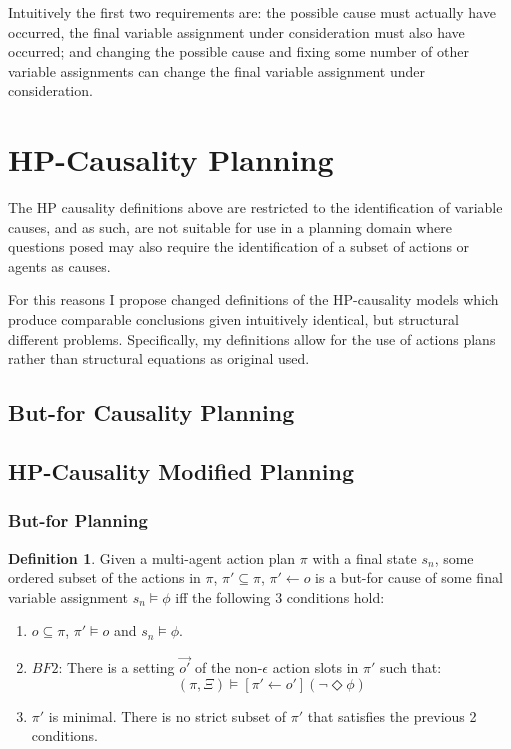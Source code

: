 \documentclass{article}
\theoremstyle{plain}
\theoremstyle{definition}
\newtheorem{defn}[thm]{Definition} %
\begin{document}
Intuitively the first two requirements are: the possible cause must actually have occurred, the final variable assignment under consideration must also have occurred; and changing the possible cause and fixing some number of other variable assignments can change the final variable assignment under consideration.




\newpage

\section{HP-Causality Planning}
The HP causality definitions above are restricted to the identification of variable causes, and as such, are not suitable for use in a planning domain where questions posed may also require the identification of a subset of actions or agents as causes.

For this reasons I propose changed definitions of the HP-causality models which produce comparable conclusions given intuitively identical, but structural different problems. Specifically, my definitions allow for the use of actions plans rather than structural equations as original used.

\subsection{But-for Causality Planning}

\subsection{HP-Causality Modified Planning}

\subsubsection*{But-for Planning}
\begin{defn} 

Given a multi-agent action plan $\pi$ with a final state $s_n$, some ordered subset of the actions in $\pi$, $\pi' \subseteq \pi$, $\pi' \leftarrow o$ is a but-for cause of some final variable assignment $s_n \models \phi$ iff the following 3 conditions hold:
\begin{enumerate}
\item  $o \subseteq \pi$, $\pi' \models o$ and $s_n \models \phi$.
\item $BF2$: There is a setting $\vec{o'}$ of the non-$\epsilon$ action slots in $\pi'$ such that:
\[
(\pi, \Xi) \models [\pi' \leftarrow o'](\lnot \Diamond \phi)
\]
\item $\pi'$ is minimal. There is no strict subset of $\pi'$ that satisfies the previous 2 conditions.
\end{enumerate}


\end{defn}
\end{document}
